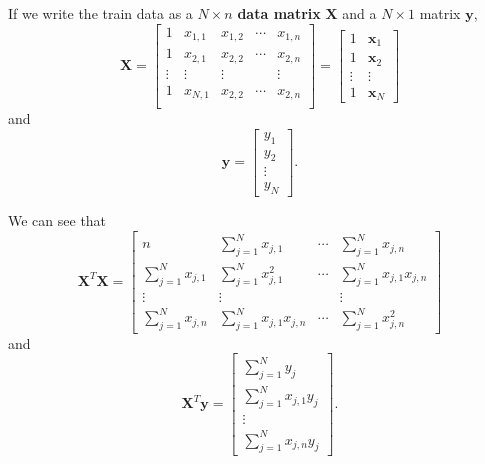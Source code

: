 \documentclass[10pt,a4paper]{article}
\begin{document}
If we write the train data as a $ N \times n $ \textbf{data matrix} $ \mathbf{X} $ and a $ N \times 1 $ matrix $ \mathbf{y} $,
\begin{equation}
\mathbf{X} = 
\begin{bmatrix}
1 & x_{1,1} & x_{1,2} & \cdots & x_{1, n} \\
1 & x_{2,1} & x_{2,2} & \cdots & x_{2, n} \\
\vdots & \vdots & \vdots & & \vdots \\
1 & x_{N,1} & x_{2,2} & \cdots & x_{2, n} \\
\end{bmatrix}
=
\begin{bmatrix}
1 & \mathbf{x}_{1} \\
1 & \mathbf{x}_{2} \\
\vdots & \vdots \\
1 & \mathbf{x}_{N}
\end{bmatrix}
\end{equation}
and
\begin{equation}
\mathbf{y} = 
\begin{bmatrix}
y_{1} \\
y_{2} \\
\vdots \\
y_{N}
\end{bmatrix}.
\end{equation}

We can see that
\begin{equation}
\mathbf{X}^{T} \mathbf{X} =
\begin{bmatrix}
n & \sum_{j=1}^{N} x_{j,1} & \cdots & \sum_{j=1}^{N} x_{j,n} \\ 
\sum_{j=1}^{N} x_{j,1} &  \sum_{j=1}^{N} x_{j,1}^{2} & \cdots & \sum_{j=1}^{N} x_{j,1} x_{j,n} \\
\vdots & \vdots & & \vdots \\
\sum_{j=1}^{N} x_{j,n} &  \sum_{j=1}^{N} x_{j,1} x_{j,n} & \cdots & \sum_{j=1}^{N} x_{j,n}^{2}
\end{bmatrix}
\end{equation}
and
\begin{equation}
\mathbf{X}^{T} \mathbf{y} = 
\begin{bmatrix}
\sum_{j=1}^{N} y_{j} \\ 
\sum_{j=1}^{N} x_{j,1} y_{j} \\
\vdots \\
\sum_{j=1}^{N} x_{j,n} y_{j} 
\end{bmatrix}.
\end{equation}
\end{document}
